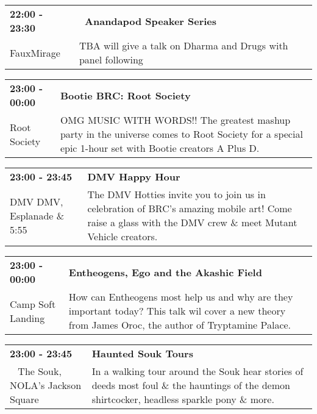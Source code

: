 \begin{tabular}{ p{1in} p{2.2in} }
    \textbf{22:00 - 23:30} & \textbf{~Anandapod Speaker Series} \\
    FauxMirage \newline  & TBA will give a talk on Dharma and Drugs with panel following \\
    \hline 
\end{tabular}
    
\begin{tabular}{ p{1in} p{2.2in} }
    \textbf{23:00 - 00:00} & \textbf{Bootie BRC: Root Society} \\
    Root Society \newline  & OMG MUSIC WITH WORDS!! The greatest mashup party in the universe comes to Root Society for a special epic 1-hour set with Bootie creators A Plus D. \\
    \hline 
\end{tabular}
    
\begin{tabular}{ p{1in} p{2.2in} }
    \textbf{23:00 - 23:45} & \textbf{DMV Happy Hour} \\
    DMV \newline DMV, Esplanade \& 5:55 & The DMV Hotties invite you to join us in celebration of BRC's amazing mobile art! Come raise a glass with the DMV crew \& meet Mutant Vehicle creators. \\
    \hline 
\end{tabular}
    
\begin{tabular}{ p{1in} p{2.2in} }
    \textbf{23:00 - 00:00} & \textbf{Entheogens, Ego and the Akashic Field} \\
    Camp Soft Landing \newline  & How can Entheogens most help us and why are they important today? This talk wil cover a new theory from James Oroc, the author of Tryptamine Palace. \\
    \hline 
\end{tabular}
    
\begin{tabular}{ p{1in} p{2.2in} }
    \textbf{23:00 - 23:45} & \textbf{Haunted Souk Tours} \\
    ~ \newline The Souk, NOLA's Jackson Square & In a walking tour around the Souk hear stories of deeds most foul \& the hauntings of the demon shirtcocker, headless sparkle pony \& more. \\
    \hline 
\end{tabular}
    
